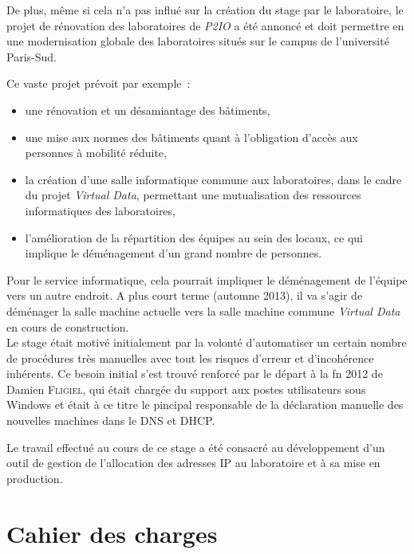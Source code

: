 \documentclass[12pt,a4paper,twoside]{report}
\makeatletter
\renewcommand\chapter{\clearpage\@startsection{chapter}{1}{-0.75em}{\baselineskip}{0.5\baselineskip}{\LARGE\textbf}}
\makeatother
\begin{document}
De plus, même si cela n’a pas influé sur la création du stage par le
laboratoire, le projet de rénovation des laboratoires de \emph{P2IO} a été
annoncé et doit permettre en une modernisation globale des laboratoires situés sur le
campus de l’université Paris-Sud.

Ce vaste projet prévoit par exemple~:

\begin{itemize}
	\item une rénovation et un désamiantage des bâtiments,
	\item une mise aux normes des bâtiments quant à l’obligation d’accès aux
	personnes à mobilité réduite,
	\item la création d’une salle informatique commune aux laboratoires, dans le
	cadre du projet \emph{Virtual Data}, permettant une mutualisation des
	ressources informatiques des laboratoires,
	\item l’amélioration de la répartition des équipes au sein des locaux, ce
	qui implique le déménagement d’un grand nombre de personnes.
\end{itemize}

Pour le service informatique, cela pourrait impliquer le déménagement de l’équipe
vers un autre endroit. A plus court terme (automne 2013), il va s'agir de déménager la salle machine actuelle
vers la salle machine commune \emph{Virtual Data} en cours de construction.\\

Le stage était motivé initialement par la volonté d'automatiser un certain nombre
de procédures très manuelles avec tout les risques d'erreur et d'incohérence inhérents.
Ce besoin initial s'est trouvé renforcé par le départ à la fn 2012 de Damien
\textsc{Fligiel}, qui était chargée du support aux postes utilisateurs sous
Windows et était à ce titre le pincipal responsable de la déclaration manuelle des nouvelles machines
dans le DNS et DHCP.

\newpage

\chapter{Travail effectué}

Le travail effectué au cours de ce stage a été consacré au développement d’un
outil de gestion de l’allocation des adresses IP au laboratoire et à sa mise en
production.

\section{Cahier des charges}
\end{document}
